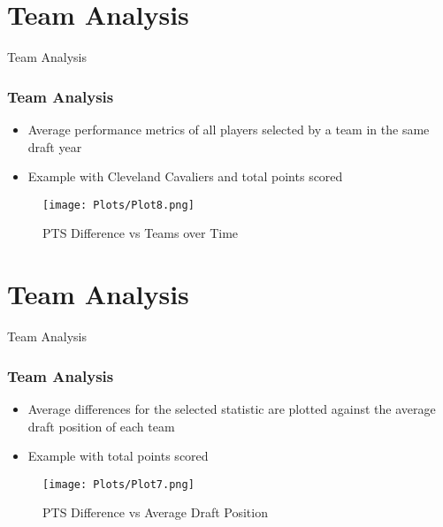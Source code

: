 \documentclass{beamer}
\begin{document}
\section{Team Analysis}
\begin{frame}{Team Analysis}
    \frametitle{Team Analysis}
    
      \begin{itemize}
        \item Average performance metrics of all players selected by a team in the same draft year
        \item Example with Cleveland Cavaliers and total points scored
      \end{itemize}
    
      \begin{figure}
        \texttt{[image: Plots/Plot8.png]}
        \caption{PTS Difference vs Teams over Time}
      \end{figure}
    
\end{frame}

\section{Team Analysis}
\begin{frame}{Team Analysis}
    \frametitle{Team Analysis}
    
      \begin{itemize}
        \item Average differences for the selected statistic are plotted against the average draft position of each team
        \item Example with total points scored
      \end{itemize}
    
      \begin{figure}
        \texttt{[image: Plots/Plot7.png]}
        \caption{PTS Difference vs Average Draft Position}
      \end{figure}
    
\end{frame}
\end{document}
